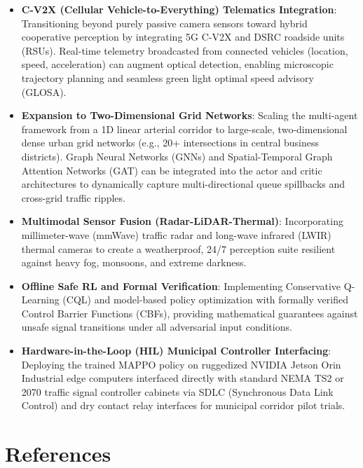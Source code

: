 \documentclass[12pt,a4paper,oneside]{report}
\begin{document}
\begin{itemize}
    \item \textbf{C-V2X (Cellular Vehicle-to-Everything) Telematics Integration}: Transitioning beyond purely passive camera sensors toward hybrid cooperative perception by integrating 5G C-V2X and DSRC roadside units (RSUs). Real-time telemetry broadcasted from connected vehicles (location, speed, acceleration) can augment optical detection, enabling microscopic trajectory planning and seamless green light optimal speed advisory (GLOSA).
    
    \item \textbf{Expansion to Two-Dimensional Grid Networks}: Scaling the multi-agent framework from a 1D linear arterial corridor to large-scale, two-dimensional dense urban grid networks (e.g., 20+ intersections in central business districts). Graph Neural Networks (GNNs) and Spatial-Temporal Graph Attention Networks (GAT) can be integrated into the actor and critic architectures to dynamically capture multi-directional queue spillbacks and cross-grid traffic ripples.
    
    \item \textbf{Multimodal Sensor Fusion (Radar-LiDAR-Thermal)}: Incorporating millimeter-wave (mmWave) traffic radar and long-wave infrared (LWIR) thermal cameras to create a weatherproof, 24/7 perception suite resilient against heavy fog, monsoons, and extreme darkness.
    
    \item \textbf{Offline Safe RL and Formal Verification}: Implementing Conservative Q-Learning (CQL) and model-based policy optimization with formally verified Control Barrier Functions (CBFs), providing mathematical guarantees against unsafe signal transitions under all adversarial input conditions.
    
    \item \textbf{Hardware-in-the-Loop (HIL) Municipal Controller Interfacing}: Deploying the trained MAPPO policy on ruggedized NVIDIA Jetson Orin Industrial edge computers interfaced directly with standard NEMA TS2 or 2070 traffic signal controller cabinets via SDLC (Synchronous Data Link Control) and dry contact relay interfaces for municipal corridor pilot trials.
\end{itemize}

\chapter*{References}
\label{ch:references}
\end{document}
